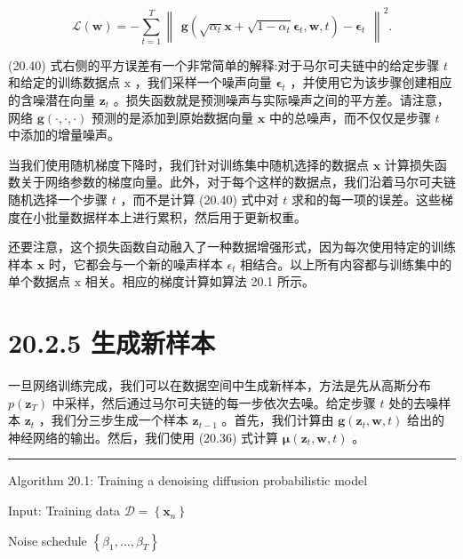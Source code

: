 \documentclass[10pt]{report}
\newcommand{\HRule}{\begin{center}\rule{0.9\linewidth}{0.2mm}\end{center}}
\begin{document}
\[
\mathcal{L}\left( \mathbf{w}\right)  =  - \mathop{\sum }\limits_{{t = 1}}^{T}{\begin{Vmatrix}\mathbf{g}\left( \sqrt{{\alpha }_{t}}\mathbf{x} + \sqrt{1 - {\alpha }_{t}}{\mathbf{\epsilon }}_{t},\mathbf{w},t\right)  - {\mathbf{\epsilon }}_{t}\end{Vmatrix}}^{2}. \tag{20.40}
\]

(20.40) 式右侧的平方误差有一个非常简单的解释:对于马尔可夫链中的给定步骤 \(t\) 和给定的训练数据点 \(\mathrm{x}\) ，我们采样一个噪声向量 \({\mathbf{\epsilon }}_{t}\) ，并使用它为该步骤创建相应的含噪潜在向量 \({\mathbf{z}}_{t}\) 。损失函数就是预测噪声与实际噪声之间的平方差。请注意，网络 \(\mathbf{g}\left( {\cdot ,\cdot , \cdot  }\right)\) 预测的是添加到原始数据向量 \(\mathbf{x}\) 中的总噪声，而不仅仅是步骤 \(t\) 中添加的增量噪声。

当我们使用随机梯度下降时，我们针对训练集中随机选择的数据点 \(\mathbf{x}\) 计算损失函数关于网络参数的梯度向量。此外，对于每个这样的数据点，我们沿着马尔可夫链随机选择一个步骤 \(t\) ，而不是计算 (20.40) 式中对 \(t\) 求和的每一项的误差。这些梯度在小批量数据样本上进行累积，然后用于更新权重。

还要注意，这个损失函数自动融入了一种数据增强形式，因为每次使用特定的训练样本 \(\mathbf{x}\) 时，它都会与一个新的噪声样本 \({\epsilon }_{t}\) 相结合。以上所有内容都与训练集中的单个数据点 \(\mathrm{x}\) 相关。相应的梯度计算如算法 20.1 所示。

\section*{20.2.5 生成新样本}

一旦网络训练完成，我们可以在数据空间中生成新样本，方法是先从高斯分布 \(p\left( {\mathbf{z}}_{T}\right)\) 中采样，然后通过马尔可夫链的每一步依次去噪。给定步骤 \(t\) 处的去噪样本 \({\mathbf{z}}_{t}\) ，我们分三步生成一个样本 \({\mathbf{z}}_{t - 1}\) 。首先，我们计算由 \(\mathbf{g}\left( {{\mathbf{z}}_{t},\mathbf{w},t}\right)\) 给出的神经网络的输出。然后，我们使用 (20.36) 式计算 \(\mathbf{\mu }\left( {{\mathbf{z}}_{t},\mathbf{w},t}\right)\) 。

\HRule

Algorithm 20.1: Training a denoising diffusion probabilistic model

\hspace*{1em} Input: Training data \(\mathcal{D} = \left\{  {\mathbf{x}}_{n}\right\}\)

\hspace*{4em} Noise schedule \(\left\{  {{\beta }_{1},\ldots ,{\beta }_{T}}\right\}\)
\end{document}
